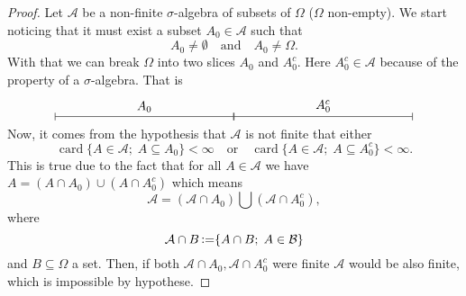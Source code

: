 \documentclass[11pt,twoside,a4paper]{article}
\DeclareMathOperator {\card}{card}
\DeclareMathOperator{\definedAs}{\vcentcolon = }
\theoremstyle{remark}
\theoremstyle{definition}
\theoremstyle{plain}
\begin{document}
\begin{proof}
    Let $\mathcal{A}$ be a non-finite $\sigma$-algebra of subsets of
    $\Omega$ ($\Omega$ non-empty). We start noticing that it must exist
    a subset $A_0 \in \mathcal{A}$ such that
    \begin{equation*}
        A_0 \neq \emptyset
        \quad \text{and} \quad
        A_0 \neq \Omega.
    \end{equation*}
    With that we can break $\Omega$ into two slices $A_0$ and $A_0^c$.
    Here $A_0^c \in \mathcal{A}$ because of the property of a $\sigma$-algebra.
    That is
    \begin{equation*}
        \begin{tikzpicture}[scale=5]
            \draw[|-|] (0,0)--(1,0) node[midway, above] {$A_0$};
            \draw[|-|]   (1,0) -- (2,0) node[midway, above] {$A_0^c$};
        \end{tikzpicture}
    \end{equation*}
    Now, it comes from the hypothesis that $\mathcal{A}$ is not finite
    that either
    \begin{equation*}
        \card \{A \in \mathcal{A}; \; A \subseteq A_0\} < \infty
        \quad \text{or} \quad
        \card \{A \in \mathcal{A}; \; A \subseteq A_0^c\} < \infty.
    \end{equation*}
    This is true due to the fact that for all $A \in \mathcal{A}$
    we have $A = (A\cap A_0) \cup (A\cap A_0^c)$ which means
    \begin{equation*}
        \mathcal{A} = (\mathcal{A}\cap A_0) \bigcup (\mathcal{A}\cap A_0^c),
    \end{equation*}
    where 
    \begin{equation*}
        \mathcal{A}\cap B \definedAs  \{A \cap B;\; A \in \mathcal{B}\}
    \end{equation*}
    and $B \subseteq \Omega$ a set.
    Then, if both $\mathcal{A}\cap A_0, \mathcal{A}\cap A_0^c$ were
    finite  $\mathcal{A}$ would be also finite, which is impossible 
    by hypothese. 


\end{proof}
\end{document}
